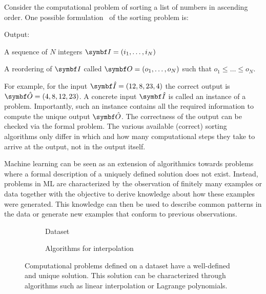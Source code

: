 Consider the computational problem of sorting a list of numbers in ascending order.
One possible formulation~\parencite{cormen_introduction_2009} of the sorting problem is:
\begin{problem}[Sorting]
\label{prob:bayesian_ml:sorting}
\begin{labeling}{Output:}
    \item[Input:] A sequence of $N$ integers $\mat{I} = (i_1, \dots, i_N)$
    \item[Output:] A reordering of $\mat{I}$ called $\mat{O} = (o_1, \dots, o_N)$ such that $o_1 \leq \dots \leq o_N$.
\end{labeling}
\end{problem}
For example, for the input $\mat{\hat{I}}=(12, 8, 23, 4)$ the correct output is $\mat{\hat{O}}=(4, 8, 12, 23)$.
A concrete input $\mat{\hat{I}}$ is called an instance of a problem.
Importantly, such an instance contains all the required information to compute the unique output $\mat{\hat{O}}$.
The correctness of the output can be checked via the formal problem.
The various available (correct) sorting algorithms only differ in which and how many computational steps they take to arrive at the output, not in the output itself.

Machine learning can be seen as an extension of algorithmics towards problems where a formal description of a uniquely defined solution does not exist.
Instead, problems in ML are characterized by the observation of finitely many examples or data together with the objective to derive knowledge about how these examples were generated.
This knowledge can then be used to describe common patterns in the data or generate new examples that conform to previous observations.

\begin{figure}[t]
    \begin{subfigure}[b]{\halffigurewidth}
        \centering
        \caption{
            Dataset
            \label{fig:bayesian_ml:polynomials:data}
        }
    \end{subfigure}
    \hfill
    \begin{subfigure}[b]{\halffigurewidth}
        \centering
        \caption{
            Algorithms for interpolation
            \label{fig:bayesian_ml:polynomials:lagrange}
        }
    \end{subfigure}
    \caption[Algorithms for interpolation]{
        \label{fig:bayesian_ml:polynoms}
        Computational problems defined on a dataset have a well-defined and unique solution.
        This solution can be characterized through algorithms such as linear interpolation or Lagrange polynomials.
    }
\end{figure}

